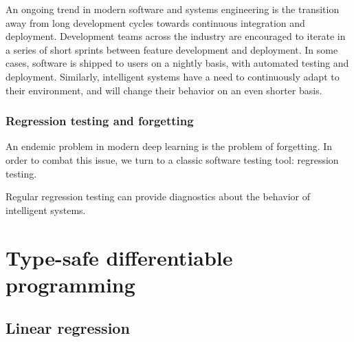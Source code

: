 \documentclass[12pt,initial,twoside,maitrise]{dms}
\numberwithin{equation}{section}
\numberwithin{table}{chapter}
\numberwithin{figure}{chapter}
\begin{document}
An ongoing trend in modern software and systems engineering is the transition away from long development cycles towards continuous integration and deployment. Development teams across the industry are encouraged to iterate in a series of short sprints between feature development and deployment. In some cases, software is shipped to users on a nightly basis, with automated testing and deployment. Similarly, intelligent systems have a need to continuously adapt to their environment, and will change their behavior on an even shorter basis.

\subsection{Regression testing and forgetting}

An endemic problem in modern deep learning is the problem of forgetting. In order to combat this issue, we turn to a classic software testing tool: regression testing.

Regular regression testing can provide diagnostics about the behavior of intelligent systems.



%
%




\appendix
\chapter{Type-safe differentiable programming}

\section{Linear regression}
\end{document}
